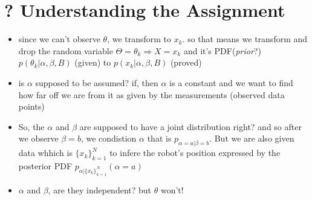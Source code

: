 \documentclass[a4paper,11pt]{article}
\begin{document}
\section{? Understanding the Assignment}
\begin{itemize}
	\item since we can't observe $\theta$, we transform to $x_k$. so that means we transform and drop the random variable $\Theta = \theta_k \Rightarrow X = x_k$  and it's PDF(\emph{prior}?) $p(\theta_k | \alpha, \beta, B)$ (given) to $p(x_k | \alpha, \beta, B)$ (proved)
	\item is $\alpha$ supposed to be assumed? if, then $\alpha$ is a constant and we want to find how far off we are from it as given by the measurements (observed data points)
	\item So, the $\alpha$ and $\beta$ are supposed to have a joint distribution right? and so after we observe $\beta = b$, we condistion $\alpha$ that is $p_{\alpha = a | \beta = b}$. But we are also given data whhich is $\{x_k\}^N _{k = 1}$ to infere the robot's position expressed by the posterior PDF $p_{\alpha | \{x_k\}^N _{k = 1}}(\alpha = a)$
	\item $\alpha$ and $\beta$, are they independent? but $\theta$ won't!
\end{itemize}
\end{document}
